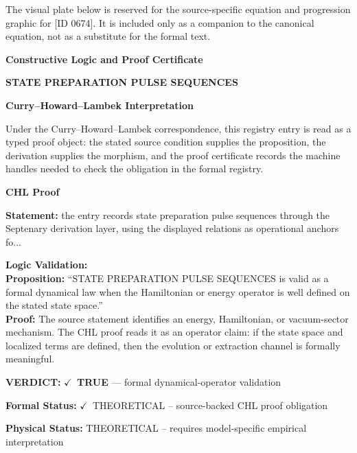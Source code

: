 \begingroup\footnotesize\sloppy
The visual plate below is reserved for the source-specific equation and progression graphic for [ID 0674]. It is included only as a companion to the canonical equation, not as a substitute for the formal text.
\par\endgroup
\ifTZPDarkEdition
{}
\fi

\clearpage
\begingroup\tzpsupportsetup
\noindent\textbf{\fontsize{10.8pt}{12.8pt}\selectfont [ID 0674] Constructive Logic and Proof Certificate}\par
\noindent\textbf{\fontsize{10pt}{12pt}\selectfont STATE PREPARATION PULSE SEQUENCES}\par
\vspace{0.45em}
\begingroup
\footnotesize
\setlength{\parskip}{0.22em}
\setlength{\parindent}{0pt}
\noindent\textbf{Curry--Howard--Lambek Interpretation}\par
Under the Curry--Howard--Lambek correspondence, this registry entry is read as a typed proof
object: the stated source condition supplies the proposition, the derivation supplies the
morphism, and the proof certificate records the machine handles needed to check the obligation
in the formal registry.

\vspace{0.45em}
\noindent\textbf{CHL Proof}\par
\textbf{Statement:} the entry records state preparation pulse sequences through the Septenary derivation
layer, using the displayed relations as operational anchors fo...

\textbf{Logic Validation:}\\
\textbf{Proposition:} ``STATE PREPARATION PULSE SEQUENCES is valid as a formal dynamical law when the
Hamiltonian or energy operator is well defined on the stated state space.''\\
\textbf{Proof:} The source statement identifies an energy, Hamiltonian, or vacuum-sector mechanism. The
CHL proof reads it as an operator claim: if the state space and localized terms are
defined, then the evolution or extraction channel is formally meaningful.

\textbf{VERDICT:} \ensuremath{\checkmark}\ \textbf{TRUE} --- formal dynamical-operator validation

\textbf{Formal Status:} \ensuremath{\checkmark}\ THEORETICAL -- source-backed CHL proof obligation

\textbf{Physical Status:} THEORETICAL -- requires model-specific empirical interpretation
\par\vspace{0.45em}
\par
\ifTZPDarkEdition
{}
\fi
\endgroup
\endgroup
